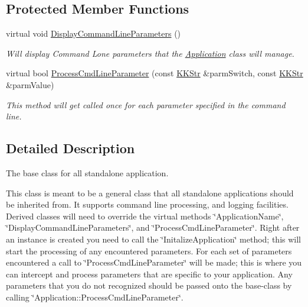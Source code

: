 \subsection*{Protected Member Functions}
\begin{DoxyCompactItemize}
\item 
virtual void \hyperlink{class_k_k_b_1_1_application_a9f3d1d39ae955c81b9f03088c61b27e8}{Display\+Command\+Line\+Parameters} ()
\begin{DoxyCompactList}\small\item\em Will display Command Lone parameters that the \textquotesingle{}\hyperlink{class_k_k_b_1_1_application}{Application}\textquotesingle{} class will manage. \end{DoxyCompactList}\item 
virtual bool \hyperlink{class_k_k_b_1_1_application_a80260251934fab49820d28e4c6b5cff9}{Process\+Cmd\+Line\+Parameter} (const \hyperlink{class_k_k_b_1_1_k_k_str}{K\+K\+Str} \&parm\+Switch, const \hyperlink{class_k_k_b_1_1_k_k_str}{K\+K\+Str} \&parm\+Value)
\begin{DoxyCompactList}\small\item\em This method will get called once for each parameter specified in the command line. \end{DoxyCompactList}\end{DoxyCompactItemize}


\subsection{Detailed Description}
The base class for all standalone application. 

This class is meant to be a general class that all standalone applications should be inherited from. It supports command line processing, and logging facilities. Derived classes will need to override the virtual methods \char`\"{}\+Application\+Name\char`\"{}, \char`\"{}\+Display\+Command\+Line\+Parameters\char`\"{}, and \char`\"{}\+Process\+Cmd\+Line\+Parameter\char`\"{}. Right after an instance is created you need to call the \char`\"{}\+Initalize\+Application\char`\"{} method; this will start the processing of any encountered parameters. For each set of parameters encountered a call to \char`\"{}\+Process\+Cmd\+Line\+Parameter\char`\"{} will be made; this is where you can intercept and process parameters that are specific to your application. Any parameters that you do not recognized should be passed onto the base-\/class by calling \char`\"{}\+Application\+::\+Process\+Cmd\+Line\+Parameter\char`\"{}. 

